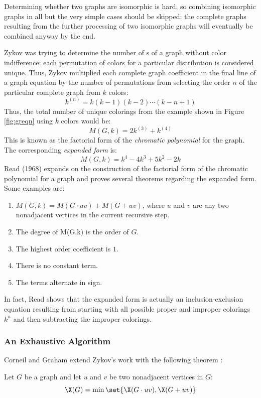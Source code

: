 Determining whether two graphs are isomorphic is hard, so combining isomorphic graphs in all but the very simple
cases should be skipped; the complete graphs resulting from the further processing of two isomorphic graphs will
eventually be combined anyway by the end.

Zykov was trying to determine the number of s of a graph without color indifference: each permutation
of colors for a particular distribution is considered unique.  Thus, Zykov multiplied each complete graph
coefficient in the final line of a graph equation by the number of permutations from selecting the order \(n\) of
the particular complete graph from \(k\) colors:
\[k^{(n)}=k(k-1)(k-2)\cdots(k-n+1)\]
Thus, the total number of unique colorings from the example shown in Figure \ref{fig:greqn} using \(k\) colors
would be:
\[M(G,k)=2k^{(3)}+k^{(4)}\]
This is known as the factorial form of the \emph{chromatic polynomial} for the graph.  The corresponding
\emph{expanded form} is:
\[M(G,k)=k^4-4k^3+5k^2-2k\]
Read (1968) \cite{read} expands on the construction of the factorial form of the chromatic polynomial for a graph
and proves several theorems regarding the expanded form.  Some examples are:
\begin{enumerate}
\item \(M(G,k)=M(G\cdot uv)+M(G+uv)\), where \(u\) and \(v\) are any two nonadjacent vertices in the current
  recursive step.
\item The degree of M(G,k) is the order of \(G\).
\item The highest order coefficient is \(1\).
\item There is no constant term.
\item The terms alternate in sign.
\end{enumerate}
In fact, Read shows that the expanded form is actually an inclusion-exclusion equation resulting from starting with
all possible proper and improper colorings \(k^n\) and then subtracting the improper colorings.

\subsubsection{An Exhaustive Algorithm}

Corneil and Graham extend Zykov's work with the following theorem \cite{corneil}:

\begin{theorem}
  \label{thm:corneil}
  Let \(G\) be a graph and let \(u\) and \(v\) be two nonadjacent vertices in \(G\):
  \[\X(G)=\min\set{\X(G\cdot uv),\X(G+uv)}\]
\end{theorem}

